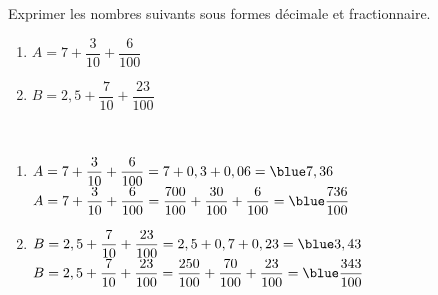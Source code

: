 \begin{exercice} %
   Exprimer les nombres suivants sous formes décimale et fractionnaire. \smallskip
   \begin{multicols}{2}
      \begin{enumerate}
         \item $A=7+\dfrac{3}{10}+\dfrac{6}{100}$
         \item $B=2,5+\dfrac{7}{10}+\dfrac{23}{100}$
      \end{enumerate}
   \end{multicols}

\end{exercice}

\begin{corrige}
   \ \\ [-5mm]
   \begin{enumerate}
      \item $A=7+\dfrac{3}{10}+\dfrac{6}{100} = 7+0,3+0,06 ={\blue 7,36}$ \\ [2mm]
         $A=7+\dfrac{3}{10}+\dfrac{6}{100} =\dfrac{700}{100}+\dfrac{30}{100}+\dfrac{6}{100} ={\blue \dfrac{736}{100}}$ \medskip
      \item $B=2,5+\dfrac{7}{10}+\dfrac{23}{100} = 2,5+0,7+0,23 ={\blue 3,43}$ \\ [2mm]
         $B=2,5+\dfrac{7}{10}+\dfrac{23}{100} =\dfrac{250}{100}+\dfrac{70}{100}+\dfrac{23}{100} ={\blue \dfrac{343}{100}}$
   \end{enumerate}
\end{corrige}